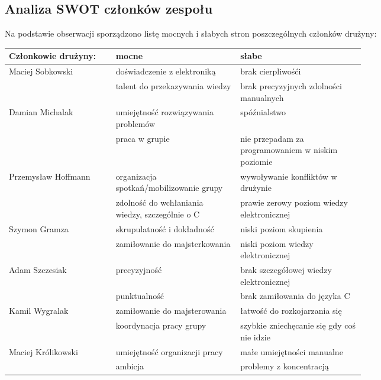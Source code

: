 \documentclass[11pt,a4paper]{article}
\begin{document}
  \subsection{Analiza SWOT członków zespołu}
  Na podstawie obserwacji sporządzono listę mocnych i słabych stron poszczególnych członków drużyny:
  \begin{center}
\begin{tabular}{|lp{0.35\linewidth}|p{0.35\linewidth}|}
  \hline 
  Członkowie drużyny: & mocne & słabe\\
  \hline
  Maciej Sobkowski & doświadczenie z elektroniką & brak cierpliwośći \\
                  & talent do przekazywania wiedzy & brak precyzyjnych zdolności manualnych  \\
  \hline              
  Damian Michalak & umiejętność rozwiązywania problemów & spóźnialstwo \\
                  & praca w grupie & nie przepadam za programowaniem w niskim poziomie \\
  \hline
  Przemysław Hoffmann & organizacja spotkań/mobilizowanie grupy & wywoływanie konfliktów w drużynie \\
                      & zdolność do wchłaniania wiedzy, szczególnie o C & prawie zerowy poziom wiedzy elektronicznej \\
  \hline
  Szymon Gramza & skrupulatność i dokładność & niski poziom skupienia \\
                & zamiłowanie do majsterkowania & niski poziom wiedzy elektronicznej \\
  \hline
  Adam Szczesiak & precyzyjność & brak szczegółowej wiedzy elektronicznej \\
                 & punktualność & brak zamiłowania do języka C \\
  \hline  
  Kamil Wygralak & zamiłowanie do majsterowania & łatwość do rozkojarzania się \\
                 & koordynacja pracy grupy & szybkie zniechęcanie się gdy coś nie idzie \\
  \hline
  Maciej Królikowski & umiejętność organizacji pracy & małe umiejętności manualne \\
                     & ambicja & problemy z koncentracją \\ 
  \hline
\end{tabular} 
\end{center}
  
\end{document}
